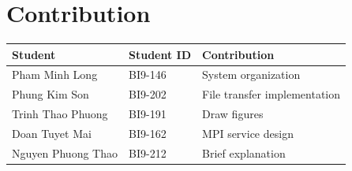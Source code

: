 \documentclass[times, 10pt]{thesisMDH}
\begin{document}
\section{Contribution}
\begin{center}
    \begin{tabular}{|l|l|l|}
        \hline
        \textbf{Student} & \textbf{Student ID} & \textbf{Contribution}\\
        \hline
        Pham Minh Long & BI9-146 & System organization \\
        \hline
        Phung Kim Son & BI9-202 & File transfer implementation\\
        \hline
        Trinh Thao Phuong & BI9-191 & Draw figures\\
        \hline
        Doan Tuyet Mai & BI9-162 & MPI service design \\
        \hline
        Nguyen Phuong Thao & BI9-212 & Brief explanation\\
        \hline
    \end{tabular}
\end{center}
\end{document}
